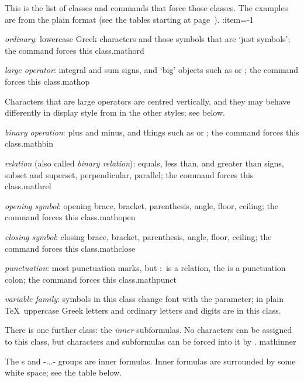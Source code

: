 This is the list of classes and commands that force those
classes. The examples are from the plain format 
(see the tables starting at page~).
\enumerate \SetCounter:item=-1
\item {\em ordinary\/}: lowercase Greek characters and those symbols
      that are `just symbols'; 
      the command  forces this class.\csterm mathord\par
\item {\em large operator\/}: integral and sum signs,
      and `big' objects such as  or ;
      the command  forces this class.\csterm mathop\par
      Characters that are
      large operators are centred vertically, and they
      may behave differently in display style from in the
      other styles; see below.
\item {\em binary operation\/}: plus and minus,
      and things such as  or ;
      the command  forces this class.\csterm mathbin\par
\item {\em relation\/} (also called {\em binary relation\/}): 
      equals, less than, and greater than signs, subset and
      superset, perpendicular, parallel;
      the command  forces this class.\csterm mathrel\par
\item {\em opening symbol\/}: opening brace, bracket, parenthesis, angle,
 \altt
      floor, ceiling;
      the command  forces this class.\csterm mathopen\par
\item {\em closing symbol\/}: closing brace, bracket, parenthesis, angle,
 \altt
      floor, ceiling;
      the command  forces this class.\csterm mathclose\par
\item {\em punctuation\/}: most punctuation marks, but
      \n:~is a relation, the  is a punctuation colon;
      the command  forces this class.\csterm mathpunct\par
\item {\em variable family\/}: symbols in this class change font
      with the  parameter; in plain \TeX\ uppercase
      Greek letters and ordinary letters and digits are
      in this class.
\enumeratestop

There is one further class: the {\em inner\/} subformulas.
No characters can be assigned to this class, but characters and
subformulas can be forced into it by .
\csterm mathinner\par
The s and \ver-\left...\right- groups
are inner formulas. Inner formulas are surrounded
by some white space; see the table below.

